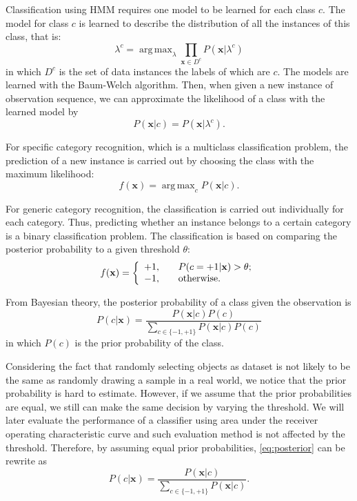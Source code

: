 \documentclass[letterpaper, 10 pt, conference]{ieeeconf}  %
\DeclareMathOperator*{\argmax}{arg\,max}
\begin{document}
Classification using HMM requires one model to be learned for each class $c$. The model for class $c$ is learned to describe the distribution of all the instances of this class, that is:
\begin{equation}
  \lambda^c = \argmax_{\lambda} \prod_{\mathbf{x} \in D^c} P(\mathbf{x}|\lambda^c)
\end{equation}
in which $D^c$ is the set of data instances the labels of which are $c$. The models are learned with the Baum-Welch algorithm. Then, when given a new instance of observation sequence, we can approximate the likelihood of a class with the learned model by
\begin{equation}
  P(\mathbf{x}|c) = P(\mathbf{x}|\lambda^c) .
\end{equation}

For specific category recognition, which is a multiclass classification problem, the prediction of a new instance is carried out by choosing the class with the maximum likelihood:
\begin{equation}
  \label{eq:classif_s}
  f(\mathbf{x}) = \argmax_{c} P(\mathbf{x}|c) .
\end{equation}

For generic category recognition, the classification is carried out individually for each category. Thus, predicting whether an instance belongs to a certain category is a binary classification problem. The classification is based on comparing the posterior probability to a given threshold $\theta$:
\begin{equation}
  \label{eq:classif_g}
  f(\mathbf{x}) = 
  \left\{ \begin{array}{l l} +1, & \quad P(c=+1|\mathbf{x}) > \theta; \\ -1, & \quad \text{otherwise.}
  \end{array} \right.
\end{equation}

From Bayesian theory, the posterior probability of a class given the observation is
\begin{equation} \label{eq:posterior}
  P(c|\mathbf{x}) = \frac{P(\mathbf{x}|c)P(c)}{\sum_{c \in \{-1,+1\}} P(\mathbf{x}|c)P(c)}
\end{equation}
in which $P(c)$ is the prior probability of the class.

Considering the fact that randomly selecting objects as dataset is not likely to be the same as randomly drawing a sample in a real world, we notice that the prior probability is hard to estimate. However, if we assume that the prior probabilities are equal, we still can make the same decision by varying the threshold. We will later evaluate the performance of a classifier using area under the receiver operating characteristic curve and such evaluation method is not affected by the threshold. Therefore, by assuming equal prior probabilities, \cref{eq:posterior} can be rewrite as 
\begin{equation}
  \label{eq:postsimp}
  P(c|\mathbf{x}) = \frac{P(\mathbf{x}|c)}{\sum_{c \in \{-1,+1\}} P(\mathbf{x}|c)} .
\end{equation}
\end{document}
